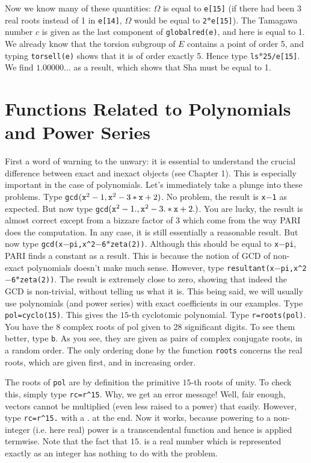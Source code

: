 Now we know many of these quantities: $\Omega$ is equal to {\tt e[15]}
(if there had been 3 real roots instead of 1 in {\tt e[14]}, $\Omega$ would
be equal to {\tt 2$*$e[15]}). The Tamagawa number $c$ is given as the last
component of {\tt globalred(e)}, and here is equal to 1. We already know
that the torsion subgroup of $E$ contains a point of order 5, and 
typing {\tt torsell(e)} shows that it is of order exactly 5. Hence type 
{\tt ls$*$25/e[15]}. We find $1.00000\dots$ as a result, which shows that 
Sha must be equal to 1.
\medskip
\section{Functions Related to Polynomials and Power Series}
\medskip
First a word of warning to the unwary: it is essential to understand the
crucial difference between exact and inexact objects (see Chapter 1). This
is especially important in the case of polynomials. Let's immediately take
a plunge into these problems. Type {\tt gcd$({\tt x}^2-1,{\tt x}^2-3*{\tt x}+2)$}. No problem,
the result is {\tt x$-$1} as expected. But now type 
{\tt gcd$({\tt x}^2-1.,{\tt x}^2-3.*{\tt x}+2.)$}. You are lucky, the result is almost
correct except from a bizzare factor of 3 which come from the way PARI does
the computation. In any case, it is still essentially a reasonable result.
But now type {\tt gcd(x$-$pi,x\^{}2$-$6$*$zeta(2))}. Although this should be
equal to {\tt x$-$pi}, PARI finds a constant as a result. This is because the
notion of GCD of non-exact polynomials doesn't make much sense. However, type
{\tt resultant(x$-$pi,x\^{}2$-$6$*$zeta(2))}. The result is extremely close
to zero, showing that indeed the GCD is non-trivial, without telling us
what it is. This being said, we will usually use polynomials (and power series)
with exact coefficients in our examples.
\smallskip
Type {\tt pol=cyclo(15)}. This gives the $15$-th cyclotomic polynomial.
Type {\tt r=roots(pol)}. You have the 8 complex roots of pol given to 28
significant digits. To see them better, type {\tt\bs b}. As you see, they are
given as pairs of complex conjugate roots, in a random order. The only ordering
done by the function {\tt roots} concerns the real roots, which are given
first, and in increasing order.

The roots of {\tt pol} are by definition the primitive $15$-th roots of unity.
To check this, simply type {\tt rc=r\^{}15}. Why, we get an error message! 
Well, fair enough, vectors cannot be multiplied (even less raised to a power) 
that easily. However, type {\tt rc=r\^{}15.} with a $.$ at the end. Now it 
works, because powering to a non-integer (i.e. here real) power is a
transcendental function and hence is applied termwise. Note that the fact that
$15.$ is a real number which is represented exactly as an integer has nothing 
to do with the problem.

